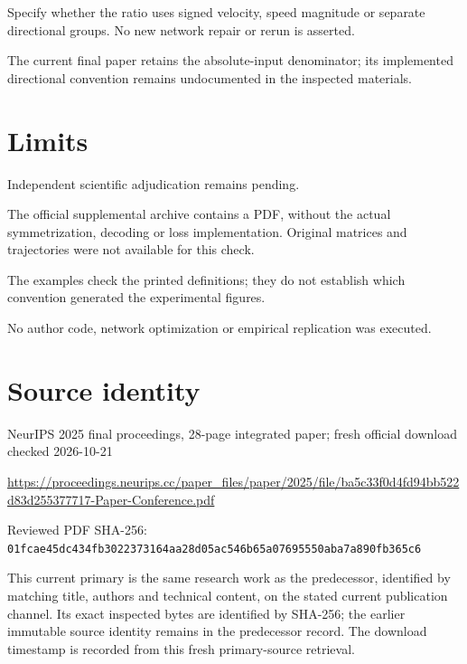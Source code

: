 \documentclass[11pt]{article}
\begin{document}
Specify whether the ratio uses signed velocity, speed magnitude or separate directional groups. No new network repair or rerun is asserted.

The current final paper retains the absolute-input denominator; its implemented directional convention remains undocumented in the inspected materials.

\section*{Limits}

Independent scientific adjudication remains pending.\par

The official supplemental archive contains a PDF, without the actual symmetrization, decoding or loss implementation. Original matrices and trajectories were not available for this check.\par

The examples check the printed definitions; they do not establish which convention generated the experimental figures.\par

No author code, network optimization or empirical replication was executed.\par

\section*{Source identity}

NeurIPS 2025 final proceedings, 28-page integrated paper; fresh official download checked 2026-10-21

\url{https://proceedings.neurips.cc/paper_files/paper/2025/file/ba5c33f0d4fd94bb522d83d255377717-Paper-Conference.pdf}

Reviewed PDF SHA-256: \nolinkurl{01fcae45dc434fb3022373164aa28d05ac546b65a07695550aba7a890fb365c6}

This current primary is the same research work as the predecessor, identified by matching title, authors and technical content, on the stated current publication channel. Its exact inspected bytes are identified by SHA-256; the earlier immutable source identity remains in the predecessor record. The download timestamp is recorded from this fresh primary-source retrieval.
\end{document}
